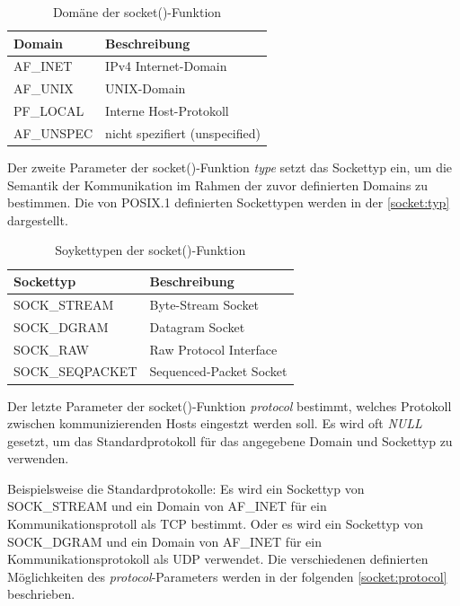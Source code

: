 \begin{table}[htbp]
	\centering
	\begin{tabular}{|l|l|}\hline
	   Domain & Beschreibung \\ \hline \hline
	   AF\_INET & IPv4 Internet-Domain \\ \hline
	   AF\_UNIX & UNIX-Domain \\ \hline
	   PF\_LOCAL & Interne Host-Protokoll \\ \hline
	   AF\_UNSPEC & nicht spezifiert (unspecified) \\ \hline
	 \end{tabular}
	 \caption[Domäne der socket()-Funktion]{Domäne der socket()-Funktion}\label{socket:domain}
\end{table} \smallskip \smallskip

Der zweite Parameter der socket()-Funktion \textit{type} setzt das Sockettyp ein, um die Semantik der Kommunikation im Rahmen der zuvor definierten Domains zu bestimmen. Die von POSIX.1 definierten Sockettypen werden in der \autoref{socket:typ} dargestellt. \smallskip \smallskip

\begin{table}[htbp]
	\centering
	\begin{tabular}{|l|l|}\hline
	   Sockettyp & Beschreibung \\ \hline \hline
	   SOCK\_STREAM & Byte-Stream Socket \\ \hline
	   SOCK\_DGRAM & Datagram Socket \\ \hline
	   SOCK\_RAW & Raw Protocol Interface \\ \hline
	   SOCK\_SEQPACKET & Sequenced-Packet Socket \\ \hline
	 \end{tabular}
	 \caption[Soykettypen der socket()-Funktion]{Soykettypen der socket()-Funktion}\label{socket:typ}
\end{table} \smallskip \smallskip

Der letzte Parameter der socket()-Funktion \textit{protocol} bestimmt, welches Protokoll zwischen kommunizierenden Hosts eingestzt werden soll. Es wird oft \textit{NULL} gesetzt, um das Standardprotokoll für das angegebene Domain und Sockettyp zu verwenden. \smallskip \smallskip

Beispielsweise die Standardprotokolle: Es wird ein Sockettyp von SOCK\_STREAM und ein Domain von AF\_INET für ein Kommunikationsprotoll als TCP bestimmt. Oder es wird ein Sockettyp von SOCK\_DGRAM und ein Domain von AF\_INET für ein Kommunikationsprotokoll als UDP verwendet. Die verschiedenen definierten Möglichkeiten des \textit{protocol}-Parameters werden in der folgenden \autoref{socket:protocol} beschrieben. \smallskip \smallskip

